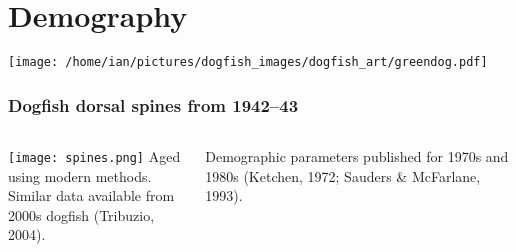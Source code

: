 \documentclass[12pt,mathserif]{beamer}
\newcommand{\PS  }[1]{\color{PS  }{#1 }\color{black}}
\newcommand{\NBC }[1]{\color{NBC }{#1 }\color{black}}
\begin{document}
\section{Demography}





\begin{frame}[plain]
\begin{center}
\NBC{\Huge{Demography}}
\texttt{[image: /home/ian/pictures/dogfish\_images/dogfish\_art/greendog.pdf]}
\end{center}
\end{frame}


\begin{frame}
\frametitle{Dogfish dorsal spines from 1942--43}
\begin{center}
\begin{columns}
  \texttt{[image: spines.png]}
  Aged using modern methods.\\

  \bigskip
  Similar data available from 2000s dogfish (Tribuzio, 2004).

  \bigskip
  Demographic parameters published for 1970s and 1980s (Ketchen, 1972; Sauders \& McFarlane, 1993).\\

  \bigskip
  \PS{Allows examination of fecundity, maturity, and growth from 1940s to 2000s.}
\end{columns}
\end{center}
\end{frame}
\end{document}
